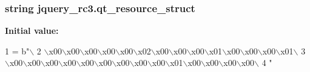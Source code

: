 \subsubsection[{qt\+\_\+resource\+\_\+struct}]{\setlength{\rightskip}{0pt plus 5cm}string jquery\+\_\+rc3.\+qt\+\_\+resource\+\_\+struct}\label{namespacejquery__rc3_af4f7252010bf6109957c4b147554da94}
{\bfseries Initial value\+:}
\begin{DoxyCode}
1 = b\textcolor{stringliteral}{"\(\backslash\)}
2 \textcolor{stringliteral}{\(\backslash\)x00\(\backslash\)x00\(\backslash\)x00\(\backslash\)x00\(\backslash\)x00\(\backslash\)x02\(\backslash\)x00\(\backslash\)x00\(\backslash\)x00\(\backslash\)x01\(\backslash\)x00\(\backslash\)x00\(\backslash\)x00\(\backslash\)x01\(\backslash\)}
3 \textcolor{stringliteral}{\(\backslash\)x00\(\backslash\)x00\(\backslash\)x00\(\backslash\)x00\(\backslash\)x00\(\backslash\)x00\(\backslash\)x00\(\backslash\)x00\(\backslash\)x00\(\backslash\)x01\(\backslash\)x00\(\backslash\)x00\(\backslash\)x00\(\backslash\)x00\(\backslash\)}
4 \textcolor{stringliteral}{"}
\end{DoxyCode}
